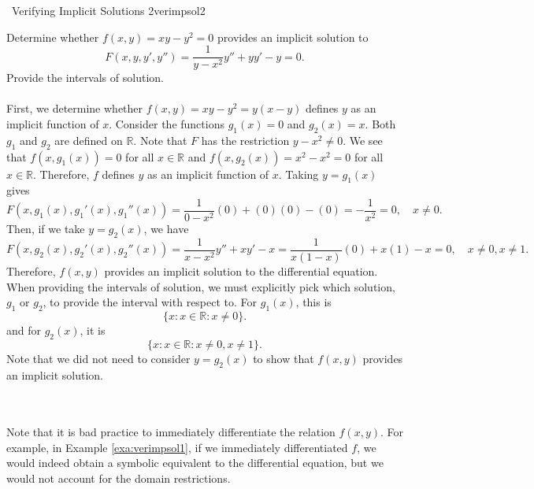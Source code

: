         \begin{example}{\Difficulty\,\Difficulty\,\,Verifying Implicit Solutions 2}{verimpsol2}
            
            Determine whether \(f(x,y)=xy-y^2=0\) provides an implicit solution to
            \begin{equation*}
                F(x,y,y',y'')=\frac{1}{y-x^2}y''+yy'-y=0.
            \end{equation*}
            Provide the intervals of solution.
            \\
            \\
            First, we determine whether \(f(x,y)=xy-y^2=y(x-y)\) defines \(y\) as an implicit function of \(x\). Consider the functions \(g_1(x)=0\) and \(g_2(x)=x\). Both \(g_1\) and \(g_2\) are defined on \(\mathbb{R}\). Note that \(F\) has the restriction \(y-x^2\neq0\). We see that \(f(x,g_1(x))=0\) for all \(x\in\mathbb{R}\) and \(f(x,g_2(x))=x^2-x^2=0\) for all \(x\in\mathbb{R}\). Therefore, \(f\) defines \(y\) as an implicit function of \(x\). Taking \(y=g_1(x)\) gives
            \begin{equation*}
                F(x,g_1(x),g_1'(x),g_1''(x))=\frac{1}{0-x^2}(0)+(0)(0)-(0)=-\frac{1}{x^2}=0,\quad x\neq0.
            \end{equation*}
            Then, if we take \(y=g_2(x)\), we have
            \begin{equation*}
                F(x,g_2(x),g_2'(x),g_2''(x))=\frac{1}{x-x^2}y''+xy'-x=\frac{1}{x(1-x)}(0)+x(1)-x=0, \quad x\neq 0,x\neq 1.
            \end{equation*}
            Therefore, \(f(x,y)\) provides an implicit solution to the differential equation. When providing the intervals of solution, we must explicitly pick which solution, \(g_1\) or \(g_2\), to provide the interval with respect to. For \(g_1(x)\), this is 
            \begin{equation*}
                \{x:x\in\mathbb{R}:x\neq0\}.
            \end{equation*}
            and for \(g_2(x)\), it is
            \begin{equation*}
                \{x:x\in\mathbb{R}:x\neq0,x\neq 1\}.
            \end{equation*}
            Note that we did not need to consider \(y=g_2(x)\) to show that \(f(x,y)\) provides an implicit solution.
        \end{example}
        \vphantom
        \\
        \\
        Note that it is bad practice to immediately differentiate the relation \(f(x,y)\). For example, in Example \ref{exa:verimpsol1}, if we immediately differentiated \(f\), we would indeed obtain a symbolic equivalent to the differential equation, but we would not account for the domain restrictions.

